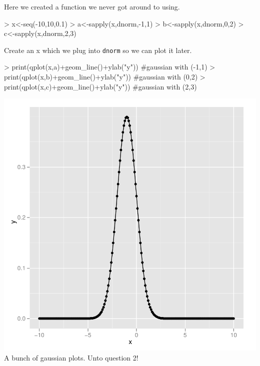 \documentclass[nogin, 10pt]{article}
\begin{document}
	
	Here we created a function we never got around to using.
\begin{Schunk}
\begin{Sinput}
> 	x<-seq(-10,10,0.1)
> 	a<-sapply(x,dnorm,-1,1)
> 	b<-sapply(x,dnorm,0,2)
> 	c<-sapply(x,dnorm,2,3)
\end{Sinput}
\end{Schunk}
Create an x which we plug into \texttt{dnorm} so we can plot it later.

\begin{Schunk}
\begin{Sinput}
> 	print(qplot(x,a)+geom_line()+ylab("y")) #gaussian with (-1,1)
> 	print(qplot(x,b)+geom_line()+ylab("y")) #gaussian with (0,2)
> 	print(qplot(x,c)+geom_line()+ylab("y")) #gaussian with (2,3)
\end{Sinput}
\end{Schunk}
\includegraphics{Sweave-003}
A bunch of gaussian plots. Unto question 2!
\end{document}
